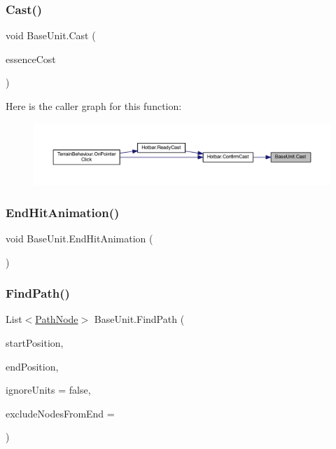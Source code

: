 \subsubsection{\texorpdfstring{Cast()}{Cast()}}
{\footnotesize\ttfamily void Base\+Unit.\+Cast (\begin{DoxyParamCaption}\item[{int}]{essence\+Cost }\end{DoxyParamCaption})}

Here is the caller graph for this function\+:
\nopagebreak
\begin{figure}[H]
\begin{center}
\leavevmode
\includegraphics[width=350pt]{class_base_unit_a5fb838313b1a61dbf38d440c2a12667e_icgraph}
\end{center}
\end{figure}
\mbox{\label{class_base_unit_ac451e0e35631687d8a40a20ce68e0e51}} 
\subsubsection{\texorpdfstring{EndHitAnimation()}{EndHitAnimation()}}
{\footnotesize\ttfamily void Base\+Unit.\+End\+Hit\+Animation (\begin{DoxyParamCaption}{ }\end{DoxyParamCaption})}

\mbox{\label{class_base_unit_a7adf93eb6a52235a25e1344e401d05d2}} 
\subsubsection{\texorpdfstring{FindPath()}{FindPath()}}
{\footnotesize\ttfamily List$<$\mbox{\hyperlink{class_path_node}{Path\+Node}}$>$ Base\+Unit.\+Find\+Path (\begin{DoxyParamCaption}\item[{Vector2\+Int}]{start\+Position,  }\item[{Vector2\+Int}]{end\+Position,  }\item[{bool}]{ignore\+Units = {\ttfamily false},  }\item[{int}]{exclude\+Nodes\+From\+End = {} }\end{DoxyParamCaption})}

